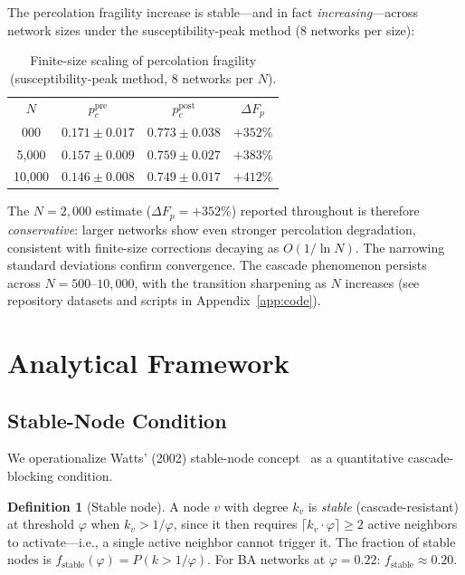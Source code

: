 \documentclass[aps,pre,twocolumn,superscriptaddress,showpacs]{revtex4-2}
\newcommand{\pc}{p_c}
\newcommand{\DF}{\Delta F}
\begin{document}
The percolation fragility increase is stable---and in fact \emph{increasing}---across network sizes under the susceptibility-peak method ($8$ networks per size):

\begin{table}[h]
\caption{Finite-size scaling of percolation fragility (susceptibility-peak method, 8 networks per $N$).}
\label{tab:fss}
\begin{ruledtabular}
\begin{tabular}{cccc}
$N$ & $\pc^{\mathrm{pre}}$ & $\pc^{\mathrm{post}}$ & $\DF_p$ \\
\colrule
2{,}000 & $0.171 \pm 0.017$ & $0.773 \pm 0.038$ & $+352\%$ \\
5{,}000 & $0.157 \pm 0.009$ & $0.759 \pm 0.027$ & $+383\%$ \\
10{,}000 & $0.146 \pm 0.008$ & $0.749 \pm 0.017$ & $+412\%$ \\
\end{tabular}
\end{ruledtabular}
\end{table}

The $N=2{,}000$ estimate ($\DF_p = +352\%$) reported throughout is therefore \emph{conservative}: larger networks show even stronger percolation degradation, consistent with finite-size corrections decaying as $O(1/\ln N)$. The narrowing standard deviations confirm convergence. The cascade phenomenon persists across $N=500$--$10{,}000$, with the transition sharpening as $N$ increases (see repository datasets and scripts in Appendix~\ref{app:code}).

\section{Analytical Framework}
\label{sec:analytical}

\subsection{Stable-Node Condition}

We operationalize Watts' (2002) stable-node concept~\cite{Watts2002} as a quantitative cascade-blocking condition.

\textbf{Definition 1} (Stable node). A node $v$ with degree $k_v$ is \emph{stable} (cascade-resistant) at threshold $\varphi$ when $k_v > 1/\varphi$, since it then requires $\lceil k_v \cdot \varphi \rceil \geq 2$ active neighbors to activate---i.e., a single active neighbor cannot trigger it. The fraction of stable nodes is $f_{\mathrm{stable}}(\varphi) = P(k > 1/\varphi)$. For BA networks at $\varphi=0.22$: $f_{\mathrm{stable}} \approx 0.20$.
\end{document}
